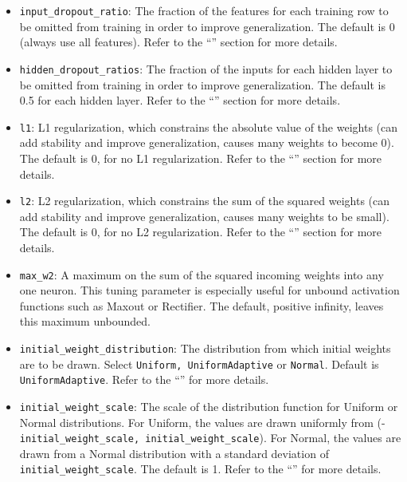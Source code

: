 \begin{itemize}
\item \texttt{input\_dropout\_ratio}: The fraction of the features for each training row to be omitted from training in order to improve generalization. The default is 0 (always use all features).  Refer to the ``'' section for more details.

\item \texttt{hidden\_dropout\_ratios}:  The fraction of the inputs for each hidden layer to be omitted from training in order to improve generalization. The default is 0.5 for each hidden layer.  Refer to the ``'' section for more details.

\item \texttt{l1}: L1 regularization, which constrains the absolute value of the weights (can add stability and improve generalization, causes many weights to become 0). The default is 0, for no L1 regularization. Refer to the ``'' section for more details.

\item \texttt{l2}: L2 regularization, which constrains the sum of the squared weights (can add stability and improve generalization, causes many weights to be small). The default is 0, for no L2 regularization. Refer to the ``'' section for more details.

\item \texttt{max\_w2}: A maximum on the sum of the squared incoming weights into any one neuron. This tuning parameter is especially useful for unbound activation functions such as Maxout or Rectifier. The default, positive infinity, leaves this maximum unbounded.

\item \texttt{initial\_weight\_distribution}: The distribution from which initial weights are to be drawn. Select \texttt{Uniform, UniformAdaptive} or \texttt{Normal}. Default is \texttt{UniformAdaptive}. Refer to the ``'' for more details.

\item \texttt{initial\_weight\_scale}: The scale of the distribution function for Uniform or Normal distributions. For Uniform, the values are drawn uniformly from (-\texttt{initial\_weight\_scale, initial\_weight\_scale}). For Normal, the values are drawn from a Normal distribution with a standard deviation of \texttt{initial\_weight\_scale}. The default is 1. Refer to the ``'' for more details.


\end{itemize}
